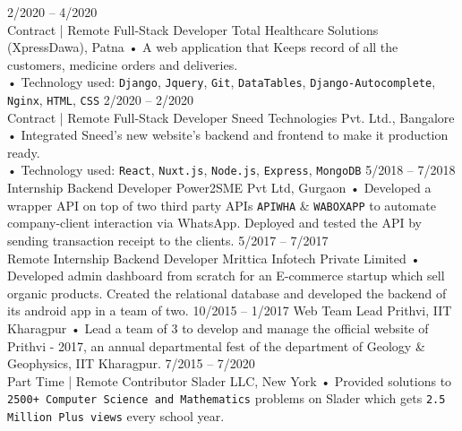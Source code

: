 \documentclass[8pt]{developercv} %
\begin{document}
\begin{entrylist}
	\entry
		{2/2020 -- 4/2020 \\\footnotesize{Contract | Remote}}
		{Full-Stack Developer}
		{Total Healthcare Solutions (XpressDawa), Patna}
		{• A web application that Keeps record of all the customers, medicine orders and deliveries.\\• Technology used: \texttt{Django}, \texttt{Jquery}, \texttt{Git}, \texttt{DataTables}, \texttt{Django-Autocomplete}, \texttt{Nginx}, \texttt{HTML}, \texttt{CSS}}
	\entry
		{2/2020 -- 2/2020 \\\footnotesize{Contract | Remote}}
		{Full-Stack Developer}
		{Sneed Technologies Pvt. Ltd., Bangalore}
		{• Integrated Sneed's new website's backend and frontend to make it production ready.\\• Technology used: \texttt{React}, \texttt{Nuxt.js}, \texttt{Node.js}, \texttt{Express}, \texttt{MongoDB}}
	\entry
		{5/2018 -- 7/2018\\\footnotesize{Internship}}
		{Backend Developer}
		{Power2SME Pvt Ltd, Gurgaon}
		{• Developed a wrapper API on top of two third party APIs \texttt{APIWHA} \& \texttt{WABOXAPP} to automate company-client interaction via WhatsApp. Deployed and tested the API by sending transaction receipt to the clients.}
	\entry
		{5/2017 -- 7/2017\\\footnotesize{Remote Internship}}
		{Backend Developer}
		{Mrittica Infotech Private Limited}
		{• Developed admin dashboard from scratch for an E-commerce startup which sell organic products. Created the relational database and developed the backend of its android app in a team of two.}
	\entry
		{10/2015 -- 1/2017}
		{Web Team Lead}
		{Prithvi, IIT Kharagpur}
		{• Lead a team of 3 to develop and manage the official website of Prithvi - 2017, an annual departmental fest of the department of Geology \& Geophysics, IIT Kharagpur.}
	\entry
		{7/2015 -- 7/2020\\\footnotesize{Part Time | Remote}}
		{Contributor}
		{Slader LLC, New York}
		{• Provided solutions to \texttt{2500+ Computer Science and Mathematics} problems on Slader which gets \texttt{2.5 Million Plus views} every school year.}
\end{entrylist}
\end{document}
